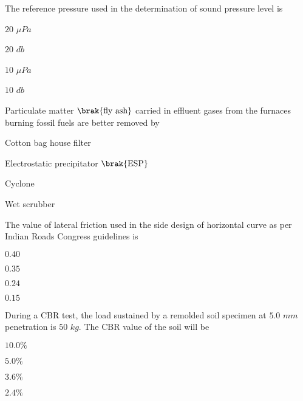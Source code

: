 \item The reference pressure used in the determination of sound pressure level is

\hfill{}
\begin{enumerate}
\begin{multicols}{4}
\item $20$ $\mu Pa$
\item $20$ $db$
\item $10$ $\mu Pa$
\item $10$ $db$
\end{multicols}
\end{enumerate}

\item Particulate matter $\brak{\text{fly ash}}$ carried in effluent gases from the furnaces burning fossil fuels are better removed by

\hfill{}
\begin{enumerate}
\begin{multicols}{2}
\item Cotton bag house filter
\item Electrostatic precipitator $\brak{\text{ESP}}$
\item Cyclone
\item Wet scrubber
\end{multicols}
\end{enumerate}

\item The value of lateral friction used in the side design of horizontal curve as per Indian Roads Congress guidelines is

\hfill{}
\begin{enumerate}
\begin{multicols}{4}
\item $0.40$
\item $0.35$
\item $0.24$
\item $0.15$
\end{multicols}
\end{enumerate}

\item During a CBR test, the load sustained by a remolded soil specimen at $5.0$ $mm$ penetration is $50$ $kg$. The CBR value of the soil will be

\hfill{}
\begin{enumerate}
\begin{multicols}{4}
\item $10.0\%$
\item $5.0\%$
\item $3.6\%$
\item $2.4\%$
\end{multicols}
\end{enumerate}

